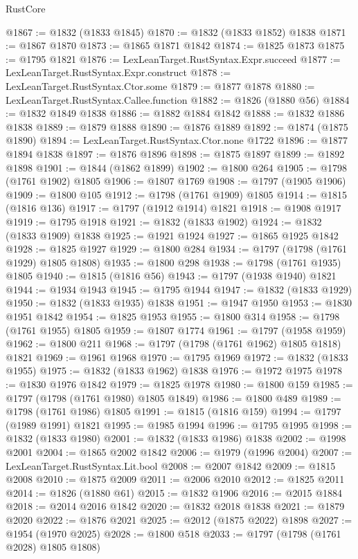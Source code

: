 \begin{lexlean}{RustCore}
\begin{coremodule}
@1867 := @1832 (@1833 @1845)
@1870 := @1832 (@1833 @1852) @1838
@1871 := @1867 @1870
@1873 := @1865 @1871 @1842
@1874 := @1825 @1873
@1875 := @1795 @1821
@1876 := LexLeanTarget.RustSyntax.Expr.succeed
@1877 := LexLeanTarget.RustSyntax.Expr.construct
@1878 := LexLeanTarget.RustSyntax.Ctor.some
@1879 := @1877 @1878
@1880 := LexLeanTarget.RustSyntax.Callee.function
@1882 := @1826 (@1880 @56)
@1884 := @1832 @1849 @1838
@1886 := @1882 @1884 @1842
@1888 := @1832 @1886 @1838
@1889 := @1879 @1888
@1890 := @1876 @1889
@1892 := @1874 (@1875 @1890)
@1894 := LexLeanTarget.RustSyntax.Ctor.none @1722
@1896 := @1877 @1894 @1838
@1897 := @1876 @1896
@1898 := @1875 @1897
@1899 := @1892 @1898
@1901 := @1844 (@1862 @1899)
@1902 := @1800 @264
@1905 := @1798 (@1761 @1902) @1805
@1906 := @1807 @1769
@1908 := @1797 (@1905 @1906)
@1909 := @1800 @105
@1912 := @1798 (@1761 @1909) @1805
@1914 := @1815 (@1816 @136)
@1917 := @1797 (@1912 @1914) @1821
@1918 := @1908 @1917
@1919 := @1795 @1918
@1921 := @1832 (@1833 @1902)
@1924 := @1832 (@1833 @1909) @1838
@1925 := @1921 @1924
@1927 := @1865 @1925 @1842
@1928 := @1825 @1927
@1929 := @1800 @284
@1934 := @1797 (@1798 (@1761 @1929) @1805 @1808)
@1935 := @1800 @298
@1938 := @1798 (@1761 @1935) @1805
@1940 := @1815 (@1816 @56)
@1943 := @1797 (@1938 @1940) @1821
@1944 := @1934 @1943
@1945 := @1795 @1944
@1947 := @1832 (@1833 @1929)
@1950 := @1832 (@1833 @1935) @1838
@1951 := @1947 @1950
@1953 := @1830 @1951 @1842
@1954 := @1825 @1953
@1955 := @1800 @314
@1958 := @1798 (@1761 @1955) @1805
@1959 := @1807 @1774
@1961 := @1797 (@1958 @1959)
@1962 := @1800 @211
@1968 := @1797 (@1798 (@1761 @1962) @1805 @1818) @1821
@1969 := @1961 @1968
@1970 := @1795 @1969
@1972 := @1832 (@1833 @1955)
@1975 := @1832 (@1833 @1962) @1838
@1976 := @1972 @1975
@1978 := @1830 @1976 @1842
@1979 := @1825 @1978
@1980 := @1800 @159
@1985 := @1797 (@1798 (@1761 @1980) @1805 @1849)
@1986 := @1800 @489
@1989 := @1798 (@1761 @1986) @1805
@1991 := @1815 (@1816 @159)
@1994 := @1797 (@1989 @1991) @1821
@1995 := @1985 @1994
@1996 := @1795 @1995
@1998 := @1832 (@1833 @1980)
@2001 := @1832 (@1833 @1986) @1838
@2002 := @1998 @2001
@2004 := @1865 @2002 @1842
@2006 := @1979 (@1996 @2004)
@2007 := LexLeanTarget.RustSyntax.Lit.bool
@2008 := @2007 @1842
@2009 := @1815 @2008
@2010 := @1875 @2009
@2011 := @2006 @2010
@2012 := @1825 @2011
@2014 := @1826 (@1880 @61)
@2015 := @1832 @1906
@2016 := @2015 @1884
@2018 := @2014 @2016 @1842
@2020 := @1832 @2018 @1838
@2021 := @1879 @2020
@2022 := @1876 @2021
@2025 := @2012 (@1875 @2022) @1898
@2027 := @1954 (@1970 @2025)
@2028 := @1800 @518
@2033 := @1797 (@1798 (@1761 @2028) @1805 @1808)

\end{coremodule}
\end{lexlean}
